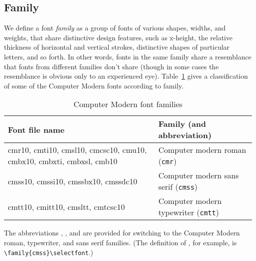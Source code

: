 \subsection{Family}\label{s:families}
We define a font {\em family} as a group
of fonts of various shapes, widths, and weights, that
share distinctive design features, such as
x-height, the relative thickness of horizontal and vertical strokes,
distinctive shapes of particular letters, and so forth.
In other words,
fonts in the same family share a resemblance that fonts from
different families don't share (though in some cases the
resemblance is obvious only to an experienced eye).
Table~\ref{fams} gives a classification of some of
the Computer Modern fonts according to family.

\begin{table}[htp]
\caption{Computer Modern font families}
\label{fams}
\begin{center}
\begin{tabular}{|p{12pc}|l|}
\hline
Font file name& Family (and abbreviation)\\
\hline
\tt \raggedright
cmr10, cmti10, cmsl10, cmcsc10, cmu10,
cmbx10, cmbxti, cmbxsl, cmb10&
Computer modern roman ({\tt cmr})\\
\hline
\tt \raggedright
cmss10, cmssi10, cmssbx10, cmssdc10&
Computer modern sans serif ({\tt cmss})\\
\hline
\tt \raggedright
cmtt10, cmitt10, cmsltt, cmtcsc10&
   Computer modern typewriter ({\tt cmtt})\\
\hline
\end{tabular}
\end{center}
\end{table}

The abbreviations , , and  are provided for
switching to the Computer Modern roman, typewriter, and sans serif
families.  (The definition of , for example, is
\verb=\family{cmss}\selectfont=.)


